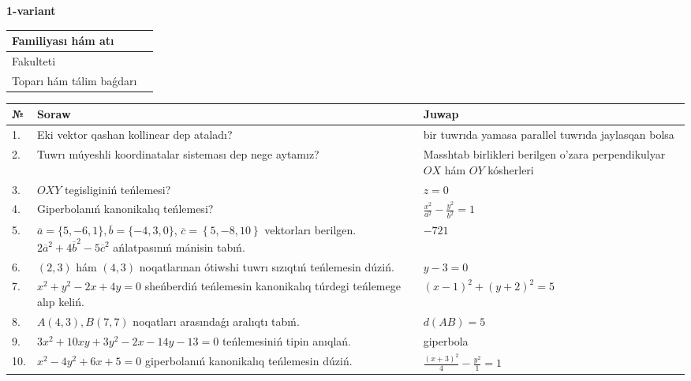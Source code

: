 \documentclass{article}
\begin{document}


\textbf{1-variant}\\

\bgroup
\def\arraystretch{1.6} %

\begin{tabular}{|m{5.7cm}|m{9.5cm}|}
\hline
Familiyası hám atı & \\
\hline
Fakulteti  & \\
\hline
Toparı hám tálim baǵdarı  & \\
\hline
\end{tabular}

\vspace{1cm}

\begin{tabular}{|m{0.7cm}|m{10cm}|m{4cm}|}
\hline
№ & Soraw & Juwap \\
\hline
1. & Eki vektor qashan kollinear dep ataladı? & bir tuwrıda yamasa parallel tuwrıda jaylasqan bolsa \\
\hline
2. & Tuwrı múyeshli koordinatalar sisteması dep nege aytamız? & Masshtab birlikleri berilgen o'zara perpendikulyar $OX$ hám $OY$ kósherleri \\
\hline
3. & $OXY$ tegisliginiń teńlemesi? & $z=0$ \\
\hline
4. & Giperbolanıń kanonikalıq teńlemesi? & $\frac{x^2}{a^2}-\frac{y^2}{b^2}=1$ \\
\hline
5. & $\overline{a}=\{5,-6, 1 \}, \overline{b}=\{-4, 3, 0 \} $, $\overline{c}=\left\{ 5,-8, 10 \right\}$ vektorları berilgen. $2{\overline{a}}^{2}+4{\overline{b}}^{2}-5{\overline{c}}^{2}$ ańlatpasınıń mánisin tabıń. & $-721$ \\
\hline
6. & $(2, 3)$ hám $(4, 3)$ noqatlarınan ótiwshi tuwrı sızıqtıń teńlemesin dúziń. & $ y-3=0$ \\
\hline
7. & $x^{2}+y^{2}-2x+4y=0$ sheńberdiń teńlemesin kanonikalıq túrdegi teńlemege alıp keliń. & $(x-1)^{2}+(y+2)^{2}=5$ \\
\hline
8. & $A(4, 3), B(7, 7)$ noqatları arasındaǵı aralıqtı tabıń. & $d(AB)=5$ \\
\hline
9. & $3x^{2}+10xy+3y^{2}-2x-14y-13=0$ teńlemesiniń tipin anıqlań. & giperbola \\
\hline
10. & $x^{2}-4y^{2}+6x+5=0$ giperbolanıń kanonikalıq teńlemesin dúziń. & $\frac{(x+3)^{2}}{4}-\frac{y^{2}}{1}=1$ \\
\hline
\end{tabular}

\vspace{1cm}
\end{document}

